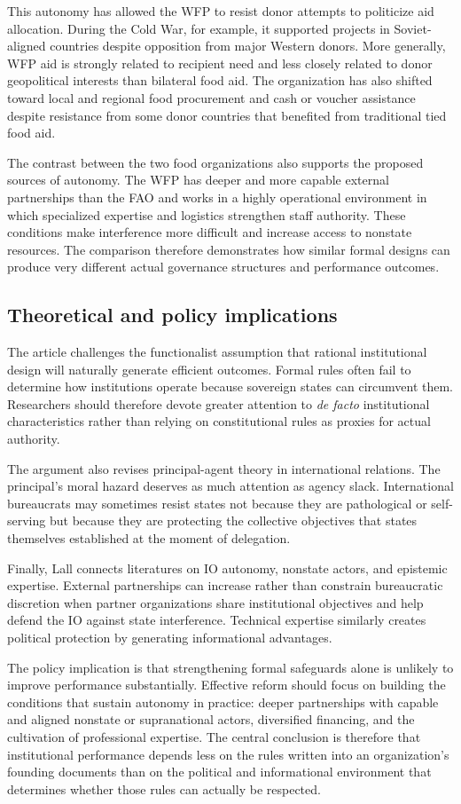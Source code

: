 This autonomy has allowed the WFP to resist donor attempts to politicize aid allocation. During the Cold War, for example, it supported projects in Soviet-aligned countries despite opposition from major Western donors. More generally, WFP aid is strongly related to recipient need and less closely related to donor geopolitical interests than bilateral food aid. The organization has also shifted toward local and regional food procurement and cash or voucher assistance despite resistance from some donor countries that benefited from traditional tied food aid.

The contrast between the two food organizations also supports the proposed sources of autonomy. The WFP has deeper and more capable external partnerships than the FAO and works in a highly operational environment in which specialized expertise and logistics strengthen staff authority. These conditions make interference more difficult and increase access to nonstate resources. The comparison therefore demonstrates how similar formal designs can produce very different actual governance structures and performance outcomes.

\subsection{Theoretical and policy implications}

The article challenges the functionalist assumption that rational institutional design will naturally generate efficient outcomes. Formal rules often fail to determine how institutions operate because sovereign states can circumvent them. Researchers should therefore devote greater attention to \emph{de facto} institutional characteristics rather than relying on constitutional rules as proxies for actual authority.

The argument also revises principal-agent theory in international relations. The principal's moral hazard deserves as much attention as agency slack. International bureaucrats may sometimes resist states not because they are pathological or self-serving but because they are protecting the collective objectives that states themselves established at the moment of delegation.

Finally, Lall connects literatures on IO autonomy, nonstate actors, and epistemic expertise. External partnerships can increase rather than constrain bureaucratic discretion when partner organizations share institutional objectives and help defend the IO against state interference. Technical expertise similarly creates political protection by generating informational advantages.

The policy implication is that strengthening formal safeguards alone is unlikely to improve performance substantially. Effective reform should focus on building the conditions that sustain autonomy in practice: deeper partnerships with capable and aligned nonstate or supranational actors, diversified financing, and the cultivation of professional expertise. The central conclusion is therefore that institutional performance depends less on the rules written into an organization's founding documents than on the political and informational environment that determines whether those rules can actually be respected.
